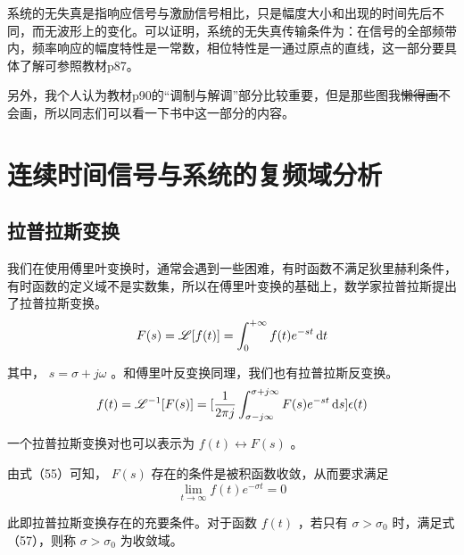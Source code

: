 \documentclass[UTF8,a4paper,11pt]{article}
\begin{document}
系统的无失真是指响应信号与激励信号相比，只是幅度大小和出现的时间先后不同，而无波形上的变化。可以证明，系统的无失真传输条件为：在信号的全部频带内，频率响应的幅度特性是一常数，相位特性是一通过原点的直线，这一部分要具体了解可参照教材p87。

另外，我个人认为教材p90的“调制与解调”部分比较重要，但是那些图我\sout{懒得画}不会画，所以同志们可以看一下书中这一部分的内容。

\section{连续时间信号与系统的复频域分析}
\subsection{拉普拉斯变换}
我们在使用傅里叶变换时，通常会遇到一些困难，有时函数不满足狄里赫利条件，有时函数的定义域不是实数集，所以在傅里叶变换的基础上，数学家拉普拉斯提出了拉普拉斯变换。
\begin{equation}
F(s)=\mathscr{L}[f(t)]=\int_0^{+\infty} {f(t)e^{-st}} \,{\rm d}t
\end{equation}

其中， $s=\sigma+j\omega$ 。和傅里叶反变换同理，我们也有拉普拉斯反变换。
\begin{equation}
f(t)=\mathscr{L}^{-1}[F(s)]=[\frac{1}{2\pi j}\int_{\sigma-j\infty}^{\sigma+j\infty} {F(s)e^{-st}} \,{\rm d}s]\epsilon (t)
\end{equation}

一个拉普拉斯变换对也可以表示为 $f(t)\leftrightarrow F(s)$ 。

由式（55）可知， $F(s)$ 存在的条件是被积函数收敛，从而要求满足
\begin{equation}
\lim_{t \to \infty}f(t)e^{-\sigma t}=0
\end{equation}

此即拉普拉斯变换存在的充要条件。对于函数 $f(t)$ ，若只有 $\sigma >\sigma_0$ 时，满足式（57），则称 $\sigma >\sigma_0$ 为收敛域。
\end{document}
